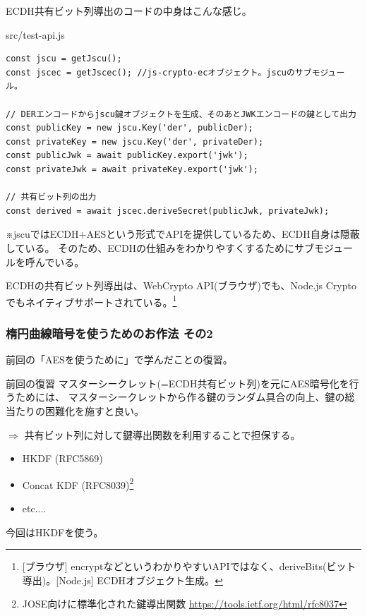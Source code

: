 \documentclass[12pt,dvipdfmx]{beamer}
\begin{document}
\begin{frame}[fragile]
\small
ECDH共有ビット列導出のコードの中身はこんな感じ。
\begin{block}{\small src/test-api.js}
\scriptsize
\begin{verbatim}
const jscu = getJscu();
const jscec = getJscec(); //js-crypto-ecオブジェクト。jscuのサブモジュール。

// DERエンコードからjscu鍵オブジェクトを生成、そのあとJWKエンコードの鍵として出力
const publicKey = new jscu.Key('der', publicDer);
const privateKey = new jscu.Key('der', privateDer);
const publicJwk = await publicKey.export('jwk');
const privateJwk = await privateKey.export('jwk');

// 共有ビット列の出力
const derived = await jscec.deriveSecret(publicJwk, privateJwk);
\end{verbatim}
\end{block}
※jscuではECDH+AESという形式でAPIを提供しているため、ECDH自身は隠蔽している。
そのため、ECDHの仕組みをわかりやすくするためにサブモジュールを呼んでいる。
\end{frame}

\begin{frame}
ECDHの共有ビット列導出は、WebCrypto API(ブラウザ)でも、Node.js Cryptoでもネイティブサポートされている。\footnote[frame]{\scriptsize [ブラウザ] encryptなどというわかりやすいAPIではなく、deriveBits(ビット導出)。[Node.js] ECDHオブジェクト生成。}
\end{frame}

\begin{frame}
\frametitle{楕円曲線暗号を使うためのお作法 その2}
前回の「AESを使うために」で学んだことの復習。

\begin{block}{\small 前回の復習}
マスターシークレット(=ECDH共有ビット列)を元にAES暗号化を行うためには、
\alert{マスターシークレットから作る鍵のランダム具合の向上、鍵の総当たりの困難化}を施すと良い。
\end{block}


$\Rightarrow$ 共有ビット列に対して鍵導出関数を利用することで担保する。
\begin{itemize}
 \item HKDF (RFC5869)
 \item Concat KDF (RFC8039)\footnote[frame]{\scriptsize JOSE向けに標準化された鍵導出関数 \url{https://tools.ietf.org/html/rfc8037}}
 \item etc....
\end{itemize}
今回はHKDFを使う。
\end{frame}
\end{document}
